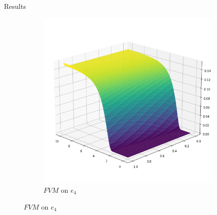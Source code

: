 \documentclass[9pt]{beamer}
\begin{document}
\begin{frame}{Results}
\begin{figure}[H]
\begin{center}
\begin{subfigure}[b]{0.4\textwidth}
\begin{center}
                    \includegraphics[scale=0.25]{img/FVM4.png}
                \end{center}
                \caption{$FVM$ on $e_4$}
            \end{subfigure}
        \end{center}
    \end{figure}
\end{frame}
\end{document}
